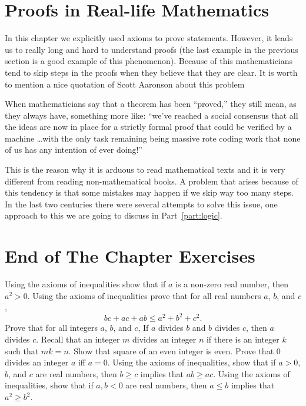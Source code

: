 \section{Proofs in Real-life Mathematics}
In this chapter we explicitly used axioms to prove statements. However, it
leads us to really long and hard to understand proofs (the last example in the
previous section is a good example of this phenomenon). Because of this
mathematicians tend to skip steps in the proofs when they believe that they are
clear. It is worth to mention a
nice quotation of Scott Aaronson about this problem
\begin{displayquote}
  When mathematicians say that a theorem has been ``proved,'' they still mean,
  as they always have, something more like: ``we’ve reached a social consensus
  that all the ideas are now in place for a strictly formal proof that could be
  verified by a machine \dots with the only task remaining being massive rote
  coding work that none of us has any intention of ever doing!''
\end{displayquote}
This is the reason why it is arduous to read mathematical texts and it
is very different from reading non-mathematical books.
A problem that arises because of this tendency is that some mistakes may happen
if we skip way too many steps. In the last two centuries there were several
attempts to solve this issue, one approach to this we are going to discuss in
Part~\ref{part:logic}.


\section*{End of The Chapter Exercises}
\begin{exercises}
  \exercise Using the axioms of inequalities show that if $a$ is a non-zero
    real number, then $a^2 > 0$.
  \exercise Using the axioms of inequalities prove that for all real
    numbers $a$, $b$, and $c$, $$bc + ac + ab \le a^2 + b^2 + c^2.$$
  \exercise Prove that for all integers $a$, $b$, and $c$,
    If $a$ divides $b$ and $b$ divides $c$, then $a$ divides $c$.
    Recall that an integer $m$ divides an integer $n$ if there is an integer
    $k$ such that $mk = n$.
  \exercise Show that square of an even integer is even.
  \exercise Prove that $0$ divides an integer $a$ iff $a = 0$.
  \exercise Using the axioms of inequalities, show that if $a > 0$, $b$, and $c$
    are real numbers, then $b \ge c$ implies that $ab \ge ac$.
  \exercise Using the axioms of inequalities, show that if $a, b < 0$ are real
    numbers, then $a \le b$ implies that $a^2 \ge b^2$.
\end{exercises}
